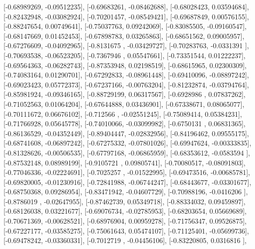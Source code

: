 \documentclass{article}
\begin{document}
       [-0.68989269, -0.09512235],
       [-0.69683261, -0.08462688],
       [-0.68028423,  0.03594684],
       [-0.82432948, -0.03082924],
       [-0.70201457, -0.08549421],
       [-0.69687849,  0.00576155],
       [-0.88247654,  0.00749641],
       [-0.75037763,  0.09242069],
       [-0.83085505, -0.09160547],
       [-0.68147669,  0.01452453],
       [-0.67898783,  0.03265863],
       [-0.68651562,  0.09005957],
       [-0.67276609, -0.04092965],
       [-0.8131675 , -0.03429727],
       [-0.70283763, -0.0331391 ],
       [-0.70693538, -0.06523205],
       [-0.7367946 ,  0.05547661],
       [-0.73351544,  0.01222237],
       [-0.69564363, -0.06282743],
       [-0.87353948,  0.02198519],
       [-0.68615965,  0.02300309],
       [-0.74083164,  0.01290701],
       [-0.67292833, -0.08961448],
       [-0.69410096, -0.08897242],
       [-0.69023423,  0.05772373],
       [-0.67237166, -0.00763204],
       [-0.81232874, -0.03794764],
       [-0.85981924, -0.09346165],
       [-0.88729199,  0.06317567],
       [-0.6928986 ,  0.07837262],
       [-0.71052563,  0.01064204],
       [-0.67644888,  0.03436901],
       [-0.67338671,  0.08065077],
       [-0.70111672,  0.06676102],
       [-0.712566  , -0.02551245],
       [-0.75089414,  0.05384231],
       [-0.71766928,  0.05645778],
       [-0.74010066, -0.03099982],
       [-0.6750131 ,  0.06831365],
       [-0.86136529, -0.04352449],
       [-0.89404447, -0.02832956],
       [-0.84196462,  0.09555175],
       [-0.68741608, -0.06897242],
       [-0.67275332, -0.07801026],
       [-0.69947624, -0.00333835],
       [-0.81328626, -0.00506535],
       [-0.67797168, -0.06865959],
       [-0.68353612, -0.0583594 ],
       [-0.87532148,  0.08989199],
       [-0.9105721 ,  0.09805741],
       [-0.70080517, -0.08091803],
       [-0.77046336, -0.02224691],
       [-0.7025257 , -0.01522995],
       [-0.69473516, -0.00685781],
       [-0.69820005, -0.01230916],
       [-0.72841988, -0.06744247],
       [-0.68443677, -0.03301677],
       [-0.68750368,  0.09286954],
       [-0.83471942, -0.04607729],
       [-0.70988196, -0.0416206 ],
       [-0.8786019 , -0.02647955],
       [-0.87462739,  0.05349718],
       [-0.88334032,  0.09459897],
       [-0.68126038,  0.03221677],
       [-0.69076734, -0.02785953],
       [-0.68203654,  0.05669689],
       [-0.70671369, -0.00628521],
       [-0.68976904,  0.00959278],
       [-0.71756347,  0.09526875],
       [-0.67227177, -0.03585275],
       [-0.75061643,  0.05474107],
       [-0.71125401, -0.05699736],
       [-0.69478242, -0.03360331],
       [-0.7012719 , -0.04456106],
       [-0.83220805,  0.0316816 ],
\end{document}
